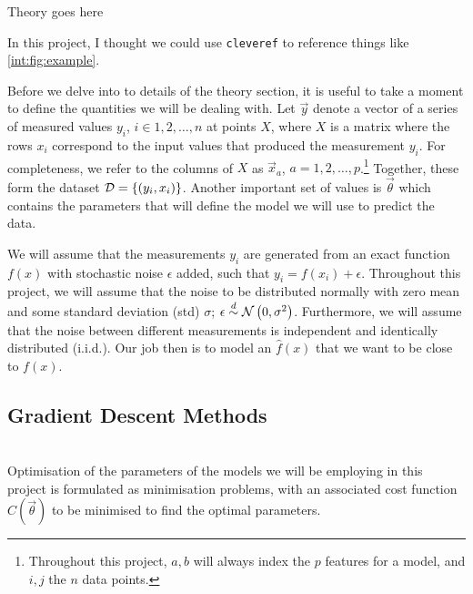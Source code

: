 Theory goes here

In this project, I thought we could use \verb|cleveref| to reference things like \cref{int:fig:example}.


Before we delve into to details of the theory section, it is useful to take a moment to define the quantities we will be dealing with. Let $\vec{y}$ denote a vector of a series of measured values $y_i$, $i\in 1, 2,\ldots, n$ at points $X$, where $X$ is a matrix where the rows $x_i$ correspond to the input values that produced the measurement $y_i$. For completeness, we refer to the columns of $X$ as $\vec{x}_a$, $a=1, 2,\ldots, p$.\footnote{Throughout this project, $a, b$ will always index the $p$ features for a model, and $i, j$ the $n$ data points.} Together, these form the dataset $\mathcal{D} = \left\{(y_i, x_i)\right\}$. Another important set of values is $\vec{\theta}$ which contains the parameters that will define the model we will use to predict the data.

We will assume that the measurements $y_i$ are generated from an exact function $f(x)$ with stochastic noise $\epsilon$ added, such that $y_i = f(x_i) + \epsilon$. Throughout this project, we will assume that the noise to be distributed normally with zero mean and some standard deviation (std) $\sigma$; $\epsilon \overset{d}{\sim} \operatorname{\mathcal{N}}\left(0,\sigma^2\right)$. Furthermore, we will assume that the noise between different measurements is independent and identically distributed (i.i.d.). Our job then is to model an $\hat{f}(x)$ that we want to be close to $f(x)$.
\subsection{Gradient Descent Methods}
    \\
    Optimisation of the parameters of the models we will be employing in this project is formulated as minimisation problems, with an associated cost function $C(\vec{\theta})$ to be minimised to find the optimal parameters.
